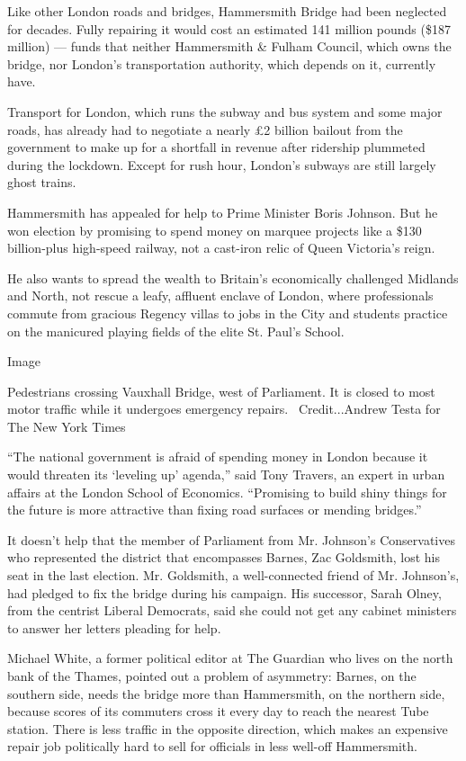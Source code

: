 Like other London roads and bridges, Hammersmith Bridge had been
neglected for decades. Fully repairing it would cost an estimated 141
million pounds (\$187 million) --- funds that neither Hammersmith \&
Fulham Council, which owns the bridge, nor London's transportation
authority, which depends on it, currently have.

Transport for London, which runs the subway and bus system and some
major roads, has already had to negotiate a nearly £2 billion bailout
from the government to make up for a shortfall in revenue after
ridership plummeted during the lockdown. Except for rush hour, London's
subways are still largely ghost trains.

Hammersmith has appealed for help to Prime Minister Boris Johnson. But
he won election by promising to spend money on marquee projects like a
\$130 billion-plus high-speed railway, not a cast-iron relic of Queen
Victoria's reign.

He also wants to spread the wealth to Britain's economically challenged
Midlands and North, not rescue a leafy, affluent enclave of London,
where professionals commute from gracious Regency villas to jobs in the
City and students practice on the manicured playing fields of the elite
St. Paul's School.

Image

Pedestrians crossing Vauxhall Bridge, west of Parliament. It is closed
to most motor traffic while it undergoes emergency repairs.
~Credit...Andrew Testa for The New York Times

``The national government is afraid of spending money in London because
it would threaten its `leveling up' agenda,'' said Tony Travers, an
expert in urban affairs at the London School of Economics. ``Promising
to build shiny things for the future is more attractive than fixing road
surfaces or mending bridges.''

It doesn't help that the member of Parliament from Mr. Johnson's
Conservatives who represented the district that encompasses Barnes, Zac
Goldsmith, lost his seat in the last election. Mr. Goldsmith, a
well-connected friend of Mr. Johnson's, had pledged to fix the bridge
during his campaign. His successor, Sarah Olney, from the centrist
Liberal Democrats, said she could not get any cabinet ministers to
answer her letters pleading for help.

Michael White, a former political editor at The Guardian who lives on
the north bank of the Thames, pointed out a problem of asymmetry:
Barnes, on the southern side, needs the bridge more than Hammersmith, on
the northern side, because scores of its commuters cross it every day to
reach the nearest Tube station. There is less traffic in the opposite
direction, which makes an expensive repair job politically hard to sell
for officials in less well-off Hammersmith.

